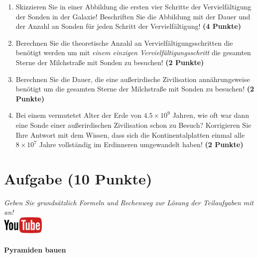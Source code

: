 \documentclass[a4paper, 9pt]{scrartcl}\usepackage[]{graphicx}\usepackage[]{xcolor}
\begin{document}
\begin{enumerate}
\item Skizzieren Sie in einer Abbildung die ersten vier Schritte der
  Vervielf{\"a}ltigung der Sonden in der Galaxie! Beschriften Sie die Abbildung
  mit der Dauer und der Anzahl an Sonden f{\"u}r jeden Schritt der Vervielf{\"a}ltigung! \textbf{(4 Punkte)}
\item Berechnen Sie die theoretische Anzahl an Vervielf{\"a}ltigungsschritten die
  ben{\"o}tigt werden um mit \textit{einem einzigen Vervielf{\"a}ltigungsschritt} die
  gesamten Sterne der Milchstra{\ss}e mit Sonden zu besuchen! \textbf{(2 Punkte)}
\item Berechnen Sie die Dauer, die eine au{\ss}erirdische Zivilisation
  ann{\"a}hrungsweise ben{\"o}tigt um die gesamten Sterne der Milchstra{\ss}e mit
  Sonden zu besuchen! \textbf{(2 Punkte)}
\item Bei einem vermutetet Alter der Erde von $\ensuremath{4.5\times 10^{9}}$ Jahren,
  wie oft war dann eine Sonde einer au{\ss}erirdischen Zivilisation schon zu
  Besuch? Korrigieren Sie Ihre Antwort mit dem Wissen, dass sich die
  Kontinentalplatten einmal alle $\ensuremath{8\times 10^{7}}$ Jahre vollst{\"a}ndig im
  Erdinneren umgewandelt haben! \textbf{(2 Punkte)}
\end{enumerate}


 
\clearpage

\section{Aufgabe \hfill (10 Punkte)}

\textit{Geben Sie grunds{\"a}tzlich Formeln und Rechenweg zur L{\"o}sung der
  Teilaufgaben mit an!} \\[1Ex]

\hfill\href{https://youtu.be/tDgr6fpkkYA}{\includegraphics[width =
  2cm]{img/youtube}} %
\hspace{2Ex}

\paragraph{Pyramiden bauen}
\end{document}
